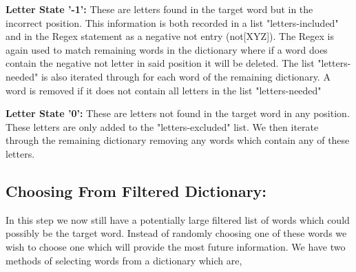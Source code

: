 \documentclass[12pt]{article}
\begin{document}
\item \textbf{Letter State '-1':} These are letters found in the target word but in the incorrect position. This information is both recorded in a list "letters-included" and in the Regex statement as a negative not entry (not[XYZ]). The Regex is again used to match remaining words in the dictionary where if a word does contain the negative not letter in said position it will be deleted. The list "letters-needed" is also iterated through for each word of the remaining dictionary. A word is removed if it does not contain all letters in the list "letters-needed"

\item \textbf{Letter State '0':} These are letters not found in the target word in any position. These letters are only added to the "letters-excluded" list. We then iterate through the remaining dictionary removing any words which contain any of these letters.


\subsection{Choosing From Filtered Dictionary:}
In this step we now still have a potentially large filtered list of words which could possibly be the target word. Instead of randomly choosing one of these words we wish to choose one which will provide the most future information. We have two methods of selecting words from a dictionary which are,
\end{document}
